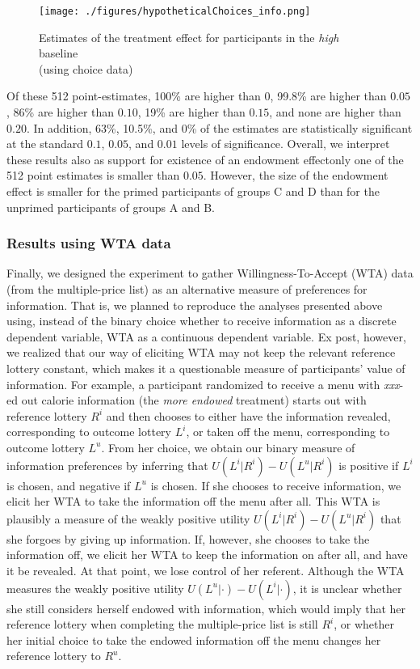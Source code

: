 \begin{figure}[ht]
  \caption{Estimates of the treatment effect for participants in the \emph{high} baseline \\ (using choice data)}\label{fig:resultsHighBaseline}
  \begin{center}
  {\texttt{[image: ./figures/hypotheticalChoices\_info.png]}}
  \end{center}
\end{figure}

Of these 512 point-estimates, 100\% are higher than $0$, 99.8\% are higher than $0.05$, 86\% are higher than $0.10$, 19\% are higher than $0.15$, and none are higher than $0.20$. In addition, 63\%, 10.5\%, and 0\% of the estimates are statistically significant at the standard $0.1$, $0.05$, and $0.01$ levels of significance. Overall, we interpret these results also as support for existence of an endowment effect\textemdash only one of the 512 point estimates is smaller than $0.05$. However, the size of the endowment effect is smaller for the primed participants of groups C and D than for the unprimed participants of groups A and B.

\subsubsection{Results using WTA data}

Finally, we designed the experiment to gather Willingness-To-Accept (WTA) data (from the multiple-price list) as an alternative measure of preferences for information. That is, we planned to reproduce the analyses presented above using, instead of the binary choice whether to receive information as a discrete dependent variable, WTA as a continuous dependent variable. Ex post, however, we realized that our way of eliciting WTA may not keep the relevant reference lottery constant, which makes it a questionable measure of participants’ value of information. For example, a participant randomized to receive a menu with \emph{xxx}-ed out calorie information (the \emph{more endowed} treatment) starts out with reference lottery $R^i$ and then chooses to either have the information revealed, corresponding to outcome lottery $L^i$, or taken off the menu, corresponding to outcome lottery $L^u$. From her choice, we obtain our binary measure of information preferences by inferring that $U(L^i|R^i)-U(L^u|R^i)$ is positive if $L^i$ is chosen, and negative if $L^u$ is chosen. If she chooses to receive information, we elicit her WTA to take the information off the menu after all. This WTA is plausibly a measure of the weakly positive utility $U(L^i|R^i)-U(L^u|R^i)$ that she forgoes by giving up information. If, however, she chooses to take the information off, we elicit her WTA to keep the information on after all, and have it be revealed. At that point, we lose control of her referent. Although the WTA measures the weakly positive utility $U(L^u|\cdot)-U(L^i|\cdot)$, it is unclear whether she still considers herself endowed with information, which would imply that her reference lottery when completing the multiple-price list is still $R^i$, or whether her initial choice to take the endowed information off the menu changes her reference lottery to $R^u$.

